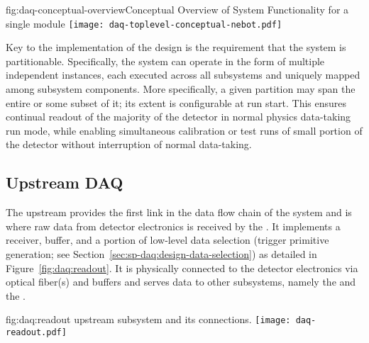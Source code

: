 \begin{dunefigure}{fig:daq-conceptual-overview}{Conceptual
   Overview of  System Functionality for a single \nominalmodsize module}
  \texttt{[image: daq-toplevel-conceptual-nebot.pdf]}
\end{dunefigure}


Key to the implementation of the  design is the requirement that
the system is partitionable. Specifically, the system can operate in
the form of multiple independent  instances, each 
executed across all  subsystems and uniquely mapped among subsystem components. 
More specifically, a given partition may span the entire %
 or some subset of it; its extent is configurable at
run start. This ensures continual readout of the
majority of the detector in normal physics data-taking run mode, while
enabling simultaneous calibration or test runs of small portion of the
detector without interruption of normal data-taking. 

\subsection{Upstream DAQ}
\label{sec:daq:design-upstream}

The upstream  provides the first link in the data flow chain of
the  system and is where raw data from detector electronics
is received by the .
It implements a receiver, buffer, and a portion of low-level data
selection (trigger primitive generation; see Section~\ref{sec:sp-daq:design-data-selection}) as detailed in Figure~\ref{fig:daq:readout}.
It is physically connected to the detector electronics via optical
fiber(s) and buffers and serves data to other  subsystems,
namely the  and the .

\begin{dunefigure}{fig:daq:readout}{ upstream  subsystem and its connections.}
  \texttt{[image: daq-readout.pdf]}
\end{dunefigure}

